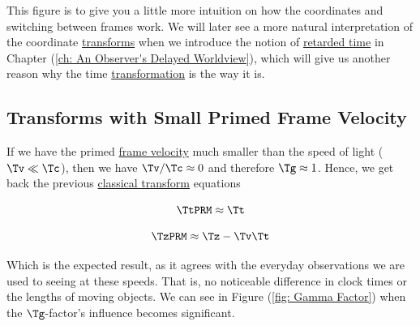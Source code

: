 This figure is to give you a little more intuition on how the coordinates and switching between frames work.
We will later see a more natural interpretation of the coordinate \hyperlink{def-transform}{transforms} when we introduce the notion of \hyperlink{def-retarded-time}{retarded time} in Chapter (\ref{ch: An Observer's Delayed Worldview}), which will give us another reason why the time \hyperlink{def-transform}{transformation} is the way it is.

\subsection{Transforms with Small Primed Frame Velocity} \label{subsect: Transforms with Slow Primed Frame Velocity}

If we have the primed \hyperlink{def-frame-velocity}{frame velocity} much smaller than the speed of light ($\Tv  \ll \Tc $), then we have ${\Tv }/{\Tc }\approx 0$ and therefore $\Tg  \approx 1$.
Hence, we get back the previous \hyperlink{def-galilean-transform}{classical transform} equations

\begin{equation}
	\TtPRM  \approx \Tt
\end{equation}

\begin{equation}
	\TzPRM  \approx {\Tz }-{\Tv }{\Tt }
\end{equation}

Which is the expected result, as it agrees with the everyday observations we are used to seeing at these speeds.
That is, no noticeable difference in clock times or the lengths of moving objects.
We can see in Figure (\ref{fig: Gamma Factor}) when the $\Tg $-factor's influence becomes significant.

